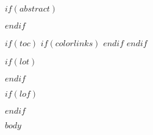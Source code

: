 \documentclass[12pt, a4paper]{report}
\begin{document}
\maketitle
\clearpage

\setcounter{page}{1}

$if(abstract)$
    \begin{abstract}
        
    \end{abstract}
$endif$


$if(toc)$
{
    $if(colorlinks)$
        \hypersetup{linkcolor=$if(toccolor)$$toccolor$$else$black$endif$}
    $endif$
    \setcounter{tocdepth}{$toc-depth$}
    \tableofcontents
    }
$endif$

$if(lot)$
    \listoftables
$endif$

$if(lof)$
    \listoffigures
$endif$

\newpage
\setcounter{secnumdepth}{2}
\setcounter{tocdepth}{1}

\setcounter{page}{1}

$body$
\end{document}
